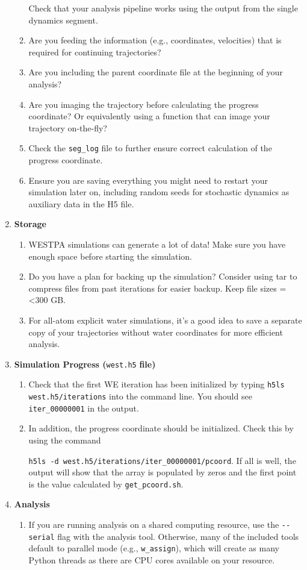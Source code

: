 \begin{enumerate}
\begin{enumerate}
Check that your analysis pipeline works using the output from the single dynamics segment. 
\item Are you feeding the information (e.g., coordinates, velocities) that is required for continuing trajectories? 
\item Are you including the parent coordinate file at the beginning of your analysis?
\item Are you imaging the trajectory before calculating the progress coordinate?  Or equivalently using a function that can image your trajectory on-the-fly?
\item Check the \verb|seg_log| file to further ensure correct calculation of the progress coordinate. 
\item Ensure you are saving everything you might need to restart your simulation later on, including random seeds for stochastic dynamics as auxiliary data in the H5 file. 
\end{enumerate}
\item \textbf{Storage}
\begin{enumerate}
\item WESTPA simulations can generate a lot of data! Make sure you have enough space before starting the simulation.
\item Do you have a plan for backing up the simulation? 
Consider using tar to compress files from past iterations for easier backup. 
Keep file sizes =<300 GB. 
\item For all-atom explicit water simulations, it's a good idea to save a separate copy of your trajectories without water coordinates for more efficient analysis.
\end{enumerate}
\item \textbf{Simulation Progress (}\verb|west.h5| \textbf{file)}
\begin{enumerate}
\item Check that the first WE iteration has been initialized by typing \verb|h5ls west.h5/iterations| into the command line.  
You should see \verb|iter_00000001| in the output.
\item In addition, the progress coordinate should be initialized.
Check this by using the command 

\verb|h5ls -d west.h5/iterations/iter_00000001/pcoord|.
If all is well, the output will show that the array is populated by zeros and the first point is the value calculated by \verb|get_pcoord.sh|.
\end{enumerate}
\item \textbf{Analysis}
\begin{enumerate}
\item If you are running analysis on a shared computing resource, use the \verb|--serial| flag with the analysis tool. 
Otherwise, many of the included tools default to parallel mode (e.g., \verb|w_assign|), which will create as many Python threads as there are CPU cores available on your resource.
\end{enumerate}
\end{enumerate}